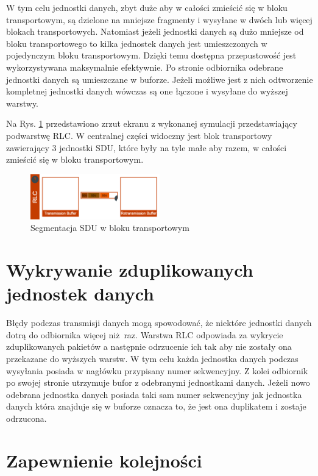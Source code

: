 W tym celu jednostki danych, zbyt duże aby w całości zmieścić się w bloku transportowym, są dzielone na mniejsze fragmenty i wysyłane w dwóch lub więcej blokach transportowych. Natomiast jeżeli jednostki danych są dużo mniejsze od bloku transportowego to kilka jednostek danych jest umieszczonych w pojedynczym bloku transportowym. Dzięki temu dostępna przepustowość jest wykorzystywana maksymalnie efektywnie. Po stronie odbiornika odebrane jednostki danych są umieszczane w buforze. Jeżeli możliwe jest z nich odtworzenie kompletnej jednostki danych wówczas są one łączone i wysyłane do wyższej warstwy.

Na Rys. \ref{fig:rlc_simulation} przedstawiono zrzut ekranu z wykonanej symulacji przedstawiający podwarstwę RLC. W centralnej części widoczny jest blok transportowy zawierający 3 jednostki SDU, które były na tyle małe aby razem, w całości zmieścić się w bloku transportowym.

\begin{figure}
	\centerline{\includegraphics[width=0.5\textwidth]{images/rlc_transport_block.png}}
	\caption{Segmentacja SDU w bloku transportowym}
	\label{fig:rlc_simulation}
\end{figure}
  
\section{Wykrywanie zduplikowanych jednostek danych}

Błędy podczas transmisji danych mogą spowodować, że niektóre jednostki danych dotrą do odbiornika więcej niż raz. Warstwa RLC odpowiada za wykrycie zduplikowanych pakietów a następnie odrzucenie ich tak aby nie zostały ona przekazane do wyższych warstw. W tym celu każda jednostka danych podczas wysyłania posiada w nagłówku przypisany numer sekwencyjny. Z kolei odbiornik po swojej stronie utrzymuje bufor z odebranymi jednostkami danych. Jeżeli nowo odebrana jednostka danych posiada taki sam numer sekwencyjny jak jednostka danych która znajduje się w buforze oznacza to, że jest ona duplikatem i zostaje odrzucona.

\section{Zapewnienie kolejności}

